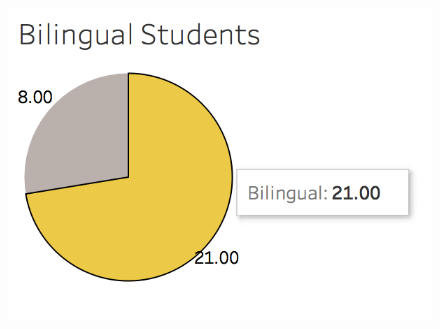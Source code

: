 \documentclass{neu_handout}
\begin{document}
\begin{figure}[h]
\centering
{
\includegraphics[width=0.4\linewidth]{languages}
}
\end{figure}
\end{document}
